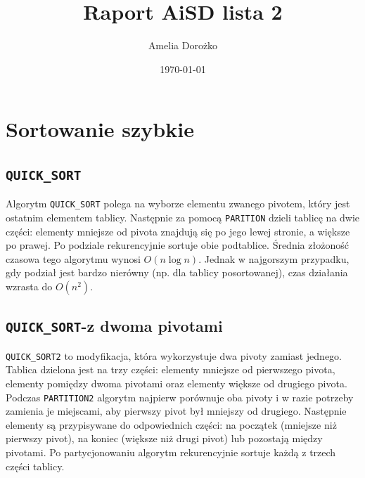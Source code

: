 \documentclass{article}
\title{Raport AiSD lista 2}
\author{Amelia Dorożko}
\date{\today}
\begin{document}
\section{Sortowanie szybkie}
\subsection{\texttt{QUICK\_SORT}}
Algorytm \texttt{QUICK\_SORT} polega na wyborze elementu zwanego pivotem, który  jest ostatnim elementem tablicy. Następnie za pomocą \texttt{PARITION} dzieli tablicę na dwie części: elementy mniejsze od pivota znajdują się po jego lewej stronie, a większe po prawej. Po podziale  rekurencyjnie sortuje obie podtablice. Średnia złożoność czasowa tego algorytmu wynosi \(O(n \log n)\). Jednak w najgorszym przypadku, gdy podział jest bardzo nierówny (np. dla tablicy posortowanej), czas działania wzrasta do \(O(n^2)\).

\subsection{\texttt{QUICK\_SORT}-z dwoma pivotami}


\texttt{QUICK\_SORT2} to modyfikacja, która wykorzystuje dwa pivoty zamiast jednego. Tablica dzielona jest na trzy części: elementy mniejsze od pierwszego pivota, elementy pomiędzy dwoma pivotami oraz elementy większe od drugiego pivota. Podczas \texttt{PARTITION2} algorytm najpierw porównuje oba pivoty i w razie potrzeby zamienia je miejscami, aby pierwszy pivot był mniejszy od drugiego. Następnie elementy są przypisywane do odpowiednich części: na początek (mniejsze niż pierwszy pivot), na koniec (większe niż drugi pivot) lub pozostają między pivotami. Po partycjonowaniu algorytm rekurencyjnie sortuje każdą z trzech części tablicy.
\end{document}
